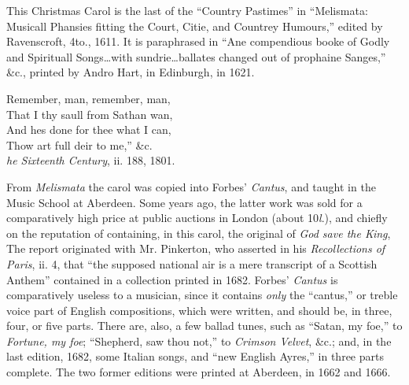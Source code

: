 
This Christmas Carol is the last of the “Country Pastimes” in “Melismata:
Musicall Phansies fitting the Court, Citie, and Countrey Humours,” edited by
Ravenscroft, 4to., 1611. It is paraphrased in “Ane compendious booke of
Godly and Spirituall Songs\ldots with sundrie\ldots ballates changed out of prophaine
Sanges,” \&c., printed by Andro Hart, in Edinburgh, in 1621.
\settowidth{\versewidth}{That I thy saull from Sathan wan,}
\begin{dcverse}Remember, man, remember, man,\\
That I thy saull from Sathan wan,\\
\columnbreak
And hes done for thee what I can,\\
\vin Thow art full deir to me,” \&c.\\
\textit{he Sixteenth Century}, ii. 188, 1801.
\end{dcverse}

From \textit{Melismata} the carol was copied into Forbes’ \textit{Cantus}, and taught in the
Music School at Aberdeen. Some years ago, the latter work was sold for a
comparatively high price at public auctions in London (about 10\textit{l}.), and chiefly
on the reputation of containing, in this carol, the original of \textit{God save the King},
The report originated with Mr. Pinkerton, who asserted in his \textit{Recollections of
Paris}, ii. 4, that “the supposed national air is a mere transcript of a Scottish
Anthem” contained in a collection printed in 1682. Forbes’ \textit{Cantus} is comparatively
useless to a musician, since it contains \textit{only} the “cantus,” or treble voice
\pagebreak%
part of English compositions, which were written, and should be, in three, four,
or five parts. There are, also, a few ballad tunes, such as “Satan, my foe,” to
\textit{Fortune, my foe}; “Shepherd, saw thou not,” to \textit{Crimson Velvet}, \&c.; and, in the
last edition, 1682, some Italian songs, and “new English Ayres,” in three parts
complete. The two former editions were printed at Aberdeen, in 1662 and 1666.



